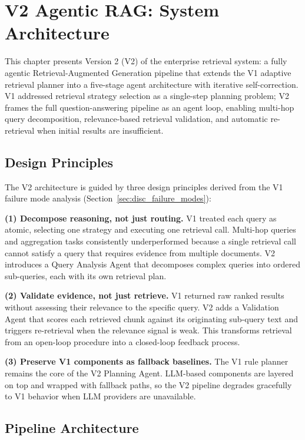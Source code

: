 \chapter{V2 Agentic RAG: System Architecture}
\label{chap:v2_methodology}

This chapter presents Version 2 (V2) of the enterprise retrieval system: a fully
agentic Retrieval-Augmented Generation pipeline that extends the V1 adaptive
retrieval planner into a five-stage agent architecture with iterative
self-correction. V1 addressed retrieval strategy selection as a single-step
planning problem; V2 frames the full question-answering pipeline as an
agent loop, enabling multi-hop query decomposition, relevance-based retrieval
validation, and automatic re-retrieval when initial results are insufficient.

\section{Design Principles}
\label{sec:v2_design}

The V2 architecture is guided by three design principles derived from the
V1 failure mode analysis (Section~\ref{sec:disc_failure_modes}):

\textbf{(1) Decompose reasoning, not just routing.} V1 treated each query as
atomic, selecting one strategy and executing one retrieval call. Multi-hop
queries and aggregation tasks consistently underperformed because a single
retrieval call cannot satisfy a query that requires evidence from multiple
documents. V2 introduces a Query Analysis Agent that decomposes complex
queries into ordered sub-queries, each with its own retrieval plan.

\textbf{(2) Validate evidence, not just retrieve.} V1 returned raw ranked
results without assessing their relevance to the specific query. V2 adds a
Validation Agent that scores each retrieved chunk against its originating
sub-query text and triggers re-retrieval when the relevance signal is weak.
This transforms retrieval from an open-loop procedure into a closed-loop
feedback process.

\textbf{(3) Preserve V1 components as fallback baselines.} The V1 rule planner
remains the core of the V2 Planning Agent. LLM-based components are layered
on top and wrapped with fallback paths, so the V2 pipeline degrades gracefully
to V1 behavior when LLM providers are unavailable.


\section{Pipeline Architecture}
\label{sec:v2_pipeline}

